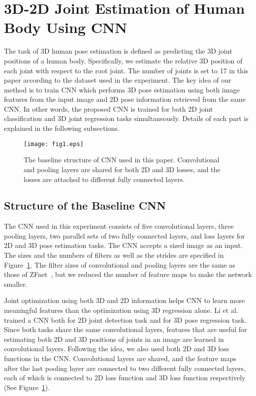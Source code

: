 \documentclass[runningheads]{llncs}
\begin{document}
\section{3D-2D Joint Estimation of Human Body Using CNN}
\label{sec:cnn}
The task of 3D human pose estimation is defined as predicting the 3D joint positions of a human body. Specifically, we estimate the relative 3D position of each joint with respect to the root joint. The number of joints  is set to 17 in this paper according to the dataset used in the experiment. The key idea of our method is to train CNN which performs 3D pose estimation using both image features from the input image and 2D pose information retrieved from the same CNN. In other words, the proposed CNN is trained for both 2D joint classification and 3D joint regression tasks simultaneously. Details of each part is explained in the following subsections.

\begin{figure}[t]
\centering
   \texttt{[image: fig1.eps]}
    \caption{The baseline structure of CNN used in this paper. Convolutional and pooling layers are shared for both 2D and 3D losses, and the losses are attached to different fully connected layers.}
    \label{fig1}
\end{figure}

\subsection{Structure of the Baseline CNN}
The CNN used in this experiment consists of five convolutional layers, three pooling layers, two parallel sets of two fully connected layers, and loss layers for 2D and 3D pose estimation tasks. The CNN accepts a  sized image as an input. The sizes and the numbers of filters as well as the strides are specified in Figure~\ref{fig1}. The filter sizes of convolutional and pooling layers are the same as those of ZFnet~\cite{zeiler2014visualizing}, but we reduced the number of feature maps to make the network smaller.

Joint optimization using both 3D and 2D information helps CNN to learn more meaningful features than the optimization using 3D regression alone. Li et al.~\cite{li20143d} trained a CNN both for 2D joint detection task and for 3D pose regression task. Since both tasks share the same convolutional layers, features that are useful for estimating both 2D and 3D positions of joints in an image are learned in convolutional layers. Following the idea, we also used both 2D and 3D loss functions in the CNN. Convolutional layers are shared, and the feature maps after the last pooling layer are connected to two different fully connected layers, each of which is connected to 2D loss function and 3D loss function respectively (See Figure~\ref{fig1}).
\end{document}
